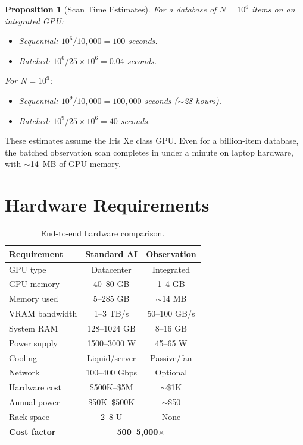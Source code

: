 \documentclass[11pt,twocolumn,a4paper]{article}
\newtheorem{proposition}[theorem]{Proposition}
\theoremstyle{definition}
\theoremstyle{remark}
\begin{document}
\begin{proposition}[Scan Time Estimates]
\label{prop:scan_time}
For a database of $N = 10^6$ items on an integrated GPU:
\begin{itemize}[nosep]
\item Sequential: $10^6 / 10{,}000 = 100$ seconds.
\item Batched: $10^6 / 25 \times 10^6 = 0.04$ seconds.
\end{itemize}
For $N = 10^9$:
\begin{itemize}[nosep]
\item Sequential: $10^9 / 10{,}000 = 100{,}000$ seconds ($\sim$28 hours).
\item Batched: $10^9 / 25 \times 10^6 = 40$ seconds.
\end{itemize}
\end{proposition}

These estimates assume the Iris Xe class GPU. Even for a billion-item database, the batched observation scan completes in under a minute on laptop hardware, with $\sim$14~MB of GPU memory.


\section{Hardware Requirements}
\label{sec:hardware_requirements}

\begin{table}[H]
\centering
\caption{End-to-end hardware comparison.}
\label{tab:hardware_full}
\begin{tabular}{@{}lcc@{}}
\toprule
\textbf{Requirement} & \textbf{Standard AI} & \textbf{Observation} \\
\midrule
GPU type & Datacenter & Integrated \\
GPU memory & 40--80 GB & 1--4 GB \\
Memory used & 5--285 GB & $\sim$14 MB \\
VRAM bandwidth & 1--3 TB/s & 50--100 GB/s \\
System RAM & 128--1024 GB & 8--16 GB \\
Power supply & 1500--3000 W & 45--65 W \\
Cooling & Liquid/server & Passive/fan \\
Network & 100--400 Gbps & Optional \\
Hardware cost & \$500K--\$5M & $\sim$\$1K \\
Annual power & \$50K--\$500K & $\sim$\$50 \\
Rack space & 2--8 U & None \\
\midrule
\textbf{Cost factor} & \multicolumn{2}{c}{\textbf{500--5{,}000$\times$}} \\
\bottomrule
\end{tabular}
\end{table}
\end{document}
